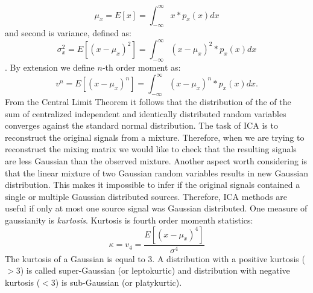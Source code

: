 \documentclass{article}
\begin{document}
\begin{equation}
\mu_x = E\left[x\right] = \int_{-\infty}^\infty x * p_x(x) dx
\end{equation}
and second is variance, defined as:
\label{1ord}
\begin{equation}
\sigma_x^2 = E\left[(x-\mu_x)^2\right] = \int_{-\infty}^\infty (x-\mu_x)^2 * p_x(x) dx
\label{2ord}
\end{equation}.
By extension we define $n$-th order moment as:
\label{nord}
\begin{equation}
v^n = E\left[(x-\mu_x)^n\right] = \int_{-\infty}^\infty (x-\mu_x)^n * p_x(x) dx.
\end{equation}
From the Central Limit Theorem it follows that the distribution of the of the sum of  centralized independent and identically distributed  random variables converges against the standard normal distribution. The task of ICA is to reconstruct the original signals from a mixture. Therefore, when we are trying to reconstruct the mixing matrix we would like to check that the resulting signals are less Gaussian than the observed mixture.
Another aspect worth considering is that the linear mixture of two Gaussian random variables results in new Gaussian distribution. This makes it impossible to infer if the original signals contained a single or multiple Gaussian distributed sources. Therefore, ICA methods are useful if only at most one source signal was Gaussian distributed.
One measure of gaussianity is \textit{kurtosis}. Kurtosis is fourth order momenth statistics:
\begin{equation}
    \kappa = v_4 = \frac{E\left[(x-\mu_x)^4\right] }{\sigma^4}
\end{equation}
The kurtosis of a Gaussian is equal to 3. A distribution with a positive kurtosis ($>3$) is called super-Gaussian (or leptokurtic) and distribution with negative kurtosis ($<3$) is sub-Gaussian (or platykurtic).
\end{document}
